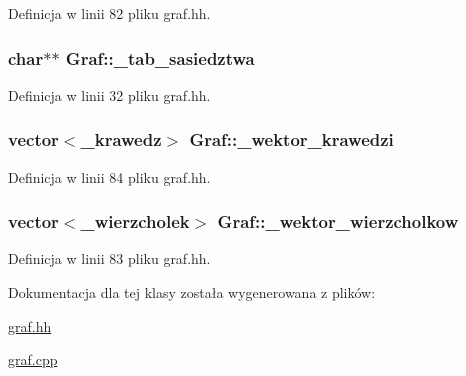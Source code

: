 \-Definicja w linii 82 pliku graf.\-hh.

\hypertarget{class_graf_a55dab6e3ffdfbddf0b90cfb2c3eb8a12}{
\subsubsection[{\-\_\-tab\-\_\-sasiedztwa}]{\setlength{\rightskip}{0pt plus 5cm}char$\ast$$\ast$ {\bf \-Graf\-::\-\_\-tab\-\_\-sasiedztwa}}}\label{class_graf_a55dab6e3ffdfbddf0b90cfb2c3eb8a12}


\-Definicja w linii 32 pliku graf.\-hh.

\hypertarget{class_graf_a79c79b147cde2bb403d3aa27db8f9f22}{
\subsubsection[{\-\_\-wektor\-\_\-krawedzi}]{\setlength{\rightskip}{0pt plus 5cm}vector$<${\bf \-\_\-krawedz}$>$ {\bf \-Graf\-::\-\_\-wektor\-\_\-krawedzi}}}\label{class_graf_a79c79b147cde2bb403d3aa27db8f9f22}


\-Definicja w linii 84 pliku graf.\-hh.

\hypertarget{class_graf_a6156d0fd54662028922b4134a92cb357}{
\subsubsection[{\-\_\-wektor\-\_\-wierzcholkow}]{\setlength{\rightskip}{0pt plus 5cm}vector$<${\bf \-\_\-wierzcholek}$>$ {\bf \-Graf\-::\-\_\-wektor\-\_\-wierzcholkow}}}\label{class_graf_a6156d0fd54662028922b4134a92cb357}


\-Definicja w linii 83 pliku graf.\-hh.



\-Dokumentacja dla tej klasy została wygenerowana z plików\-:\begin{DoxyCompactItemize}
\item 
\hyperlink{graf_8hh}{graf.\-hh}\item 
\hyperlink{graf_8cpp}{graf.\-cpp}\end{DoxyCompactItemize}
